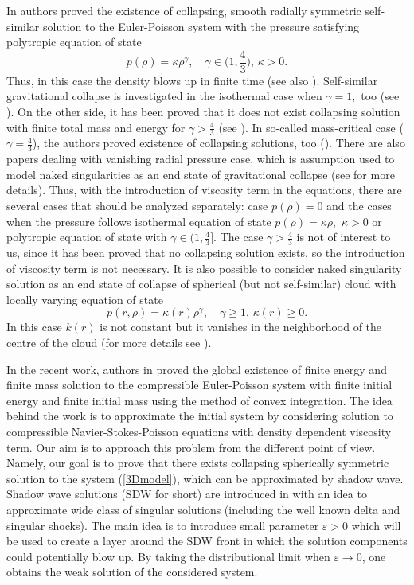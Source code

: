 \documentclass[reqno]{article}%
\theoremstyle{plain}
\theoremstyle{definition}
\theoremstyle{remark}
\numberwithin{equation}{section}
\begin{document}
 In \cite{Hadzgamma} authors proved the existence of collapsing, smooth radially symmetric self-similar solution to the Euler-Poisson system with the pressure satisfying polytropic equation of state
\[p(\rho)=\kappa \rho^\gamma,\quad \gamma \in \Big(1,\frac{4}{3}\Big),\,\kappa>0.\]  
Thus, in this case the density blows up in finite time (see also \cite{Brenner, Weber}). Self-similar gravitational collapse is investigated in the isothermal case when $\gamma=1,$ too (see \cite{Hadz1, shu}). On the other side, it has been proved that it does not exist collapsing solution with finite total mass and energy for $\gamma>\frac{4}{3}$ (see \cite{deng}). In so-called mass-critical case ($\gamma=\frac{4}{3}$), the authors proved existence of collapsing solutions, too (\cite{Gol, Makino}).  There are also papers dealing with vanishing radial pressure case, which is assumption used to model naked singularities as an end state of gravitational collapse (see \cite{Barve,ash, Sha} for more details). Thus, with the introduction of viscosity term in the equations, there are several cases that should be analyzed separately: case $p(\rho)=0$ and the cases when the pressure follows isothermal equation of state $p(\rho)=\kappa \rho,$ $\kappa>0$ or polytropic equation of state with $\gamma\in(1,\frac{4}{3}].$ The case $\gamma>\frac{4}{3}$ is not of interest to us, since it has been proved that no collapsing solution exists, so the introduction of viscosity term is not necessary. It is also possible to consider naked singularity solution as an end state of  collapse of spherical (but not self-similar) cloud with locally varying equation of state
\begin{equation}\label{varying_p}
p(r,\rho)=\kappa(r)\rho^\gamma, \quad \gamma\geq 1,\, \kappa(r)\geq 0. 
\end{equation}
In this case $k(r)$ is not constant but it vanishes in the neighborhood of the centre of the cloud (for more details see \cite{Sha}).


In the recent work, authors in \cite{chen} proved the global existence of finite energy and finite mass solution to the compressible Euler-Poisson system with finite initial energy and finite initial mass using the method of convex integration. The idea behind the work is to approximate the initial system by considering solution to compressible Navier-Stokes-Poisson equations with density dependent viscosity term. Our aim is to approach this problem from the different point of view. Namely, our goal is to prove that there exists collapsing spherically symmetric solution to the system (\ref{3Dmodel}), which can be approximated by shadow wave. 
Shadow wave solutions (SDW for short) are introduced in \cite{mn2010} with an idea to approximate wide class of singular solutions (including the well known delta and singular shocks). The main idea is to introduce small parameter $\varepsilon>0$ which will be used to create a layer around the SDW front in which the solution components could potentially blow up. By taking the distributional  limit when $\varepsilon\to 0$, one obtains the weak solution of the considered system.
\end{document}
